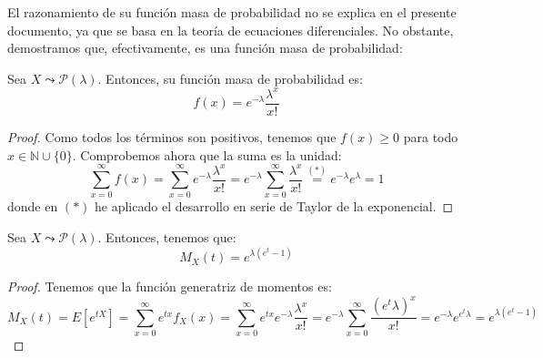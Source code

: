 El razonamiento de su función masa de probabilidad no se explica en el presente documento, ya que se basa en la teoría de ecuaciones diferenciales. No obstante, demostramos que, efectivamente, es una función masa de probabilidad:
\begin{prop} Sea $X\leadsto \mathcal{P}(\lambda)$. Entonces, su función masa de probabilidad es:
    \begin{equation*}
        f(x)=e^{-\lambda}\frac{\lambda^x}{x!}
    \end{equation*}
\end{prop}
\begin{proof}
    Como todos los términos son positivos, tenemos que $f(x)\geq 0$ para todo $x\in \mathbb{N}\cup \{0\}$. Comprobemos ahora que la suma es la unidad:
    \begin{equation*}
        \sum_{x=0}^\infty f(x)
        = \sum_{x=0}^\infty e^{-\lambda}\frac{\lambda^x}{x!}
        = e^{-\lambda}\sum_{x=0}^\infty \frac{\lambda^x}{x!}
        \stackrel{(\ast)}{=} e^{-\lambda}e^\lambda = 1
    \end{equation*}
    donde en $(\ast)$ he aplicado el desarrollo en serie de Taylor de la exponencial.
\end{proof}


\begin{prop}
    Sea $X\leadsto \mathcal{P}(\lambda)$. Entonces, tenemos que:
    \begin{equation*}
        M_X(t)= e^{\lambda(e^t-1)}
    \end{equation*}
\end{prop}
\begin{proof} Tenemos que la función generatriz de momentos es:
\begin{equation*}
    M_X(t)=E[e^{tX}] = \sum_{x=0}^\infty e^{tx}f_X(x) = \sum_{x=0}^\infty e^{tx}e^{-\lambda}\frac{\lambda^x}{x!}
    =e^{-\lambda}\sum_{x=0}^\infty \frac{(e^t\lambda)^x}{x!} = e^{-\lambda}e^{e^t\lambda} = e^{\lambda(e^t-1)}
\end{equation*}
\end{proof}


